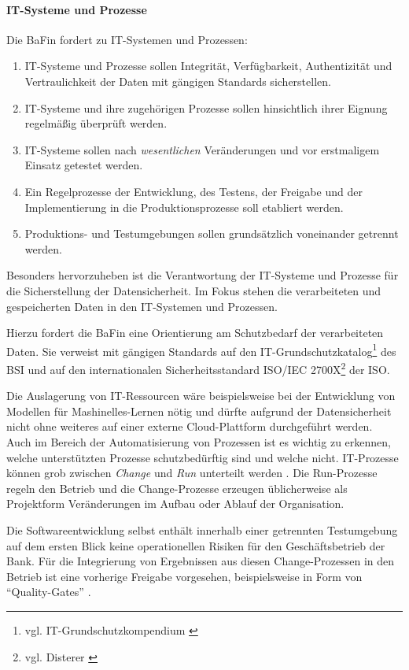 \paragraph{IT-Systeme und Prozesse}
Die \ac{BaFin} \cite{MaRisk:2017} fordert zu IT-Systemen und Prozessen:
\begin{enumerate}
    \item IT-Systeme und Prozesse sollen Integrität, Verfügbarkeit, Authentizität und Vertraulichkeit der Daten mit gängigen Standards sicherstellen.
    \item IT-Systeme und ihre zugehörigen Prozesse sollen hinsichtlich ihrer Eignung regelmäßig überprüft werden.
    \item IT-Systeme sollen nach \emph{wesentlichen} Veränderungen und vor erstmaligem Einsatz getestet werden.
    \item Ein Regelprozesse der Entwicklung, des Testens, der Freigabe und der Implementierung in die Produktionsprozesse soll etabliert werden. 
    \item Produktions- und Testumgebungen sollen grundsätzlich voneinander getrennt werden.
\end{enumerate}
%
Besonders hervorzuheben ist die Verantwortung der IT-Systeme und Prozesse für die Sicherstellung der Datensicherheit. Im Fokus stehen die verarbeiteten und gespeicherten Daten in den IT-Systemen und Prozessen. 

Hierzu fordert die BaFin \cite{MaRisk:2017} eine Orientierung am Schutzbedarf der verarbeiteten Daten. Sie verweist mit gängigen Standards auf den IT-Grundschutzkatalog\footnote{vgl. IT-Grundschutzkompendium \cite{IT-Grundschutz:2020}} des \ac{BSI} und auf den internationalen Sicherheitsstandard ISO/IEC 2700X\footnote{vgl. Disterer \cite{Disterer2013}} der \ac{ISO}.

Die Auslagerung von IT-Ressourcen wäre beispielsweise bei der Entwicklung von Modellen für Mashinelles-Lernen nötig und dürfte aufgrund der Datensicherheit nicht ohne weiteres auf einer externe Cloud-Plattform durchgeführt werden. 
\medskip
\\
Auch im Bereich der Automatisierung von Prozessen ist es wichtig zu erkennen, welche unterstützten Prozesse schutzbedürftig sind und welche nicht. IT-Prozesse können grob zwischen \emph{Change} und \emph{Run} unterteilt werden \cite{Dorschel2018}. Die Run-Prozesse regeln den Betrieb und die Change-Prozesse erzeugen üblicherweise als Projektform Veränderungen im Aufbau oder Ablauf der Organisation.

Die Softwareentwicklung selbst enthält innerhalb einer getrennten Testumgebung auf dem ersten Blick keine operationellen Risiken für den Geschäftsbetrieb der Bank. Für die Integrierung von Ergebnissen aus diesen Change-Prozessen in den Betrieb ist eine vorherige Freigabe vorgesehen, beispielsweise in Form von \enquote{Quality-Gates} \cite{mci/Disterer2011}.

